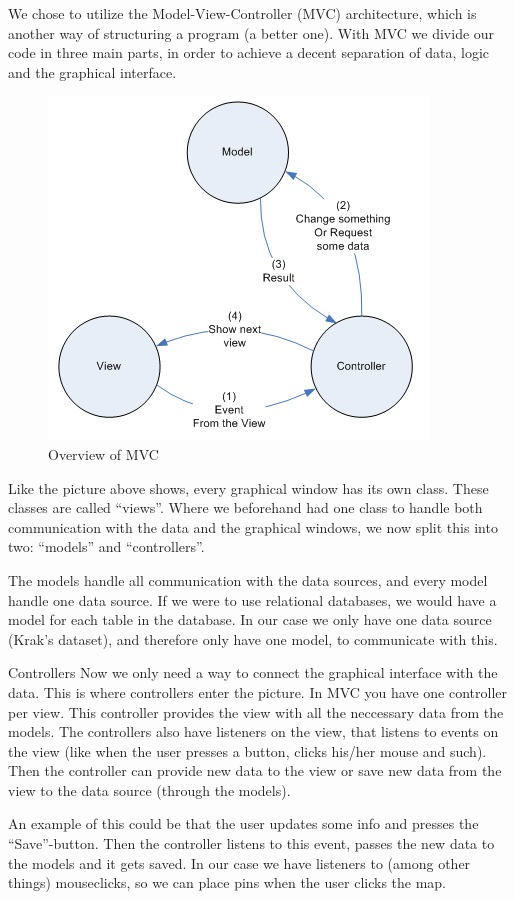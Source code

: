 We chose to utilize the Model-View-Controller (MVC) architecture, which is
another way of structuring a program (a better one). With MVC we divide our code
in three main parts, in order to achieve a decent separation of data, logic and
the graphical interface.

\begin{figure}[h!]
\centering
\includegraphics[width=0.5\linewidth]{images/mvc}
\caption{Overview of MVC}
\label{mvc-overview}
\end{figure}

Like the picture above shows, every graphical window has its own class. These
classes are called ``views''. Where we beforehand had one class to handle both
communication with the data and the graphical windows, we now split this into
two: ``models'' and ``controllers''.

The models handle all communication with the data sources, and every model
handle one data source. If we were to use relational databases, we would have a
model for each table in the database. In our case we only have one data source
(Krak's dataset), and therefore only have one model, to communicate with this.

Controllers
Now we only need a way to connect the graphical interface with the data. This is
where controllers enter the picture. In MVC you have one controller per view.
This controller provides the view with all the neccessary data from the models.
The controllers also have listeners on the view, that listens to events on the
view (like when the user presses a button, clicks his/her mouse and such). Then
the controller can provide new data to the view or save new data from the view
to the data source (through the models).

An example of this could be that the user updates some info and presses the 
``Save''-button. Then the controller listens to this event, passes the new data
to the models and it gets saved.
In our case we have listeners to (among other things) mouseclicks, so we can
place pins when the user clicks the map.
